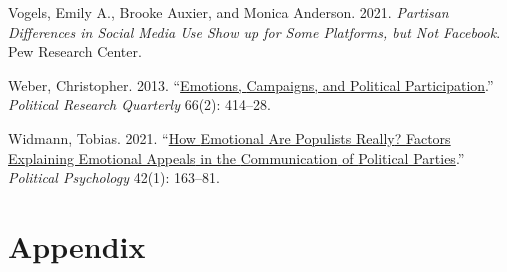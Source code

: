 \documentclass[a4paper,11pt]{article}
\newlength{\cslhangindent}
\newenvironment{CSLReferences}[2] %
 {\setlength{\cslhangindent}{#2\parindent}%
  \setlength{\parindent}{0pt}%
  \everypar{\setlength{\hangindent}{\cslhangindent}}\ignorespaces}
 {\par}
\begin{document}
\begin{CSLReferences}{1}{0}
\leavevmode{}%
Vogels, Emily A., Brooke Auxier, and Monica Anderson. 2021. \emph{Partisan Differences in Social Media Use Show up for Some Platforms, but Not {Facebook}}. {Pew Research Center}.

\leavevmode{}%
Weber, Christopher. 2013. {``\href{https://doi.org/10.1177/1065912912449697}{Emotions, {Campaigns}, and {Political Participation}}.''} \emph{Political Research Quarterly} 66(2): 414--28.

\leavevmode{}%
Widmann, Tobias. 2021. {``\href{https://doi.org/10.1111/pops.12693}{How {Emotional Are Populists Really}? {Factors Explaining Emotional Appeals} in the {Communication} of {Political Parties}}.''} \emph{Political Psychology} 42(1): 163--81.

\end{CSLReferences}
\indent
\setlength{\parindent}{17pt}
\setlength{\leftskip}{0pt}
\setlength{\parskip}{0pt}

\newpage
\appendix

\hypertarget{appendix}{%
\section{Appendix}\label{appendix}}
\end{document}
